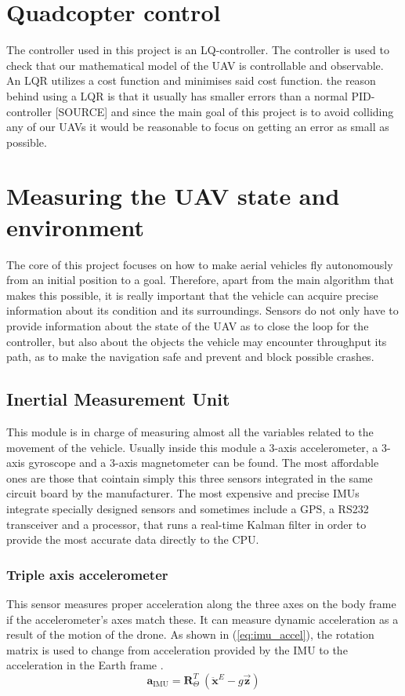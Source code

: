 \documentclass[journal]{IEEEtran}
\newcommand*{\subb}[1]{_{\mathrm{#1}}}
\begin{document}
	\section{Quadcopter control}
	The controller used in this project is an LQ-controller. The controller is used to check that our mathematical model of the UAV is controllable and observable.  An LQR utilizes a cost function and minimises said cost function. the reason behind using a LQR is that it usually has smaller errors than a normal PID-controller [SOURCE] and since the main goal of this project is to avoid colliding any of our UAVs it would be reasonable to focus on getting an error as small as possible.   
	
	\section{Measuring the UAV state and environment}
	The core of this project focuses on how to make aerial vehicles fly autonomously from an initial position to a goal. Therefore, apart from the main algorithm that makes this possible, it is really important that the vehicle can acquire precise information about its condition and its surroundings. Sensors do not only have to provide information about the state of the UAV as to close the loop for the controller, but also about the objects the vehicle may encounter throughput its path, as to make the navigation safe and prevent and block possible crashes.\\

		\subsection{Inertial Measurement Unit}
		This module is in charge of measuring almost all the variables related to the movement of the vehicle. Usually inside this module  a 3-axis accelerometer, a 3-axis gyroscope and a 3-axis magnetometer can be found. The most affordable ones are those that cointain simply this three sensors integrated in the same circuit board by the manufacturer. The most expensive and precise IMUs integrate specially designed sensors and sometimes include a GPS, a RS232 transceiver and a processor, that runs a real-time Kalman filter in order to provide the most accurate data directly to the CPU. \\
		

		\subsubsection{Triple axis accelerometer} This sensor measures proper acceleration along the three axes on the body frame if the accelerometer's axes match these. It can measure dynamic acceleration as a result of the motion of the drone.  As shown in (\ref{eq:imu_accel}), the rotation matrix is used to change from acceleration provided by the IMU to the acceleration in the Earth frame \cite{modelling_control_mahony}.\\
		\begin{equation} \label{eq:imu_accel}
		\bm{a}\subb{IMU}= \bm{R}^T_\Theta \ (\bm{\ddot{x}}^E - g \bm{\vec{z}})
		\end{equation}
		
\end{document}
